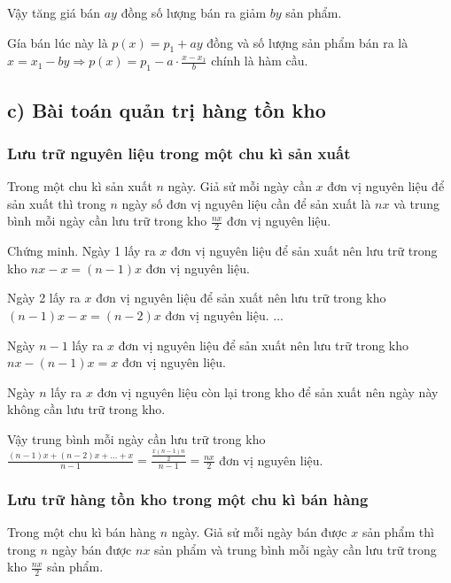 		Vậy tăng giá bán $ay$ đồng số lượng bán ra giảm $by$ sản phẩm.

		Gía bán lúc này là $p(x) = p_1 + ay$ đồng và số lượng sản phẩm bán ra là $x = x_1 - by \Rightarrow p(x) = p_1 - a \cdot \frac{x-x_1}{b}$ chính là hàm cầu.

	\subsection*{c) Bài toán quản trị hàng tồn kho}
		\subsubsection*{Lưu trữ nguyên liệu trong một chu kì sản xuất}
		Trong một chu kì sản xuất $n$ ngày. Giả sử mỗi ngày cần $x$ đơn vị nguyên liệu để sản xuất thì trong $n$ ngày số đơn vị nguyên liệu cần để sản xuất là $nx$ và trung bình mỗi ngày cần lưu trữ trong kho $\frac{nx}{2}$ đơn vị nguyên liệu.

		Chứng minh. Ngày 1 lấy ra $x$ đơn vị nguyên liệu để sản xuất nên lưu trữ trong kho $nx - x = (n-1)x$ đơn vị nguyên liệu.

		Ngày 2 lấy ra $x$ đơn vị nguyên liệu để sản xuất nên lưu trữ trong kho $(n-1)x - x = (n-2)x$ đơn vị nguyên liệu.
		...

		Ngày $n-1$ lấy ra $x$ đơn vị nguyên liệu để sản xuất nên lưu trữ trong kho $nx - (n-1)x = x$ đơn vị nguyên liệu.

		Ngày $n$ lấy ra $x$ đơn vị nguyên liệu còn lại trong kho để sản xuất nên ngày này không cần lưu trữ trong kho.

		Vậy trung bình mỗi ngày cần lưu trữ trong kho $\frac{(n-1)x + (n-2)x + \dots + x}{n-1} = \frac{\frac{x(n-1)n}{2}}{n-1} = \frac{nx}{2}$ đơn vị nguyên liệu.

		\subsubsection*{Lưu trữ hàng tồn kho trong một chu kì bán hàng}
		Trong một chu kì bán hàng $n$ ngày. Giả sử mỗi ngày bán được $x$ sản phẩm thì trong $n$ ngày bán được $nx$ sản phẩm và trung bình mỗi ngày cần lưu trữ trong kho $\frac{nx}{2}$ sản phẩm.
